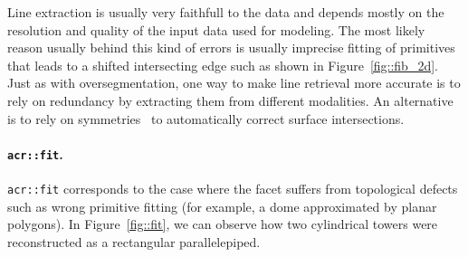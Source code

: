                 \begin{figure}[htb]
                    \centering
                \end{figure}

                Line extraction is usually very faithfull to the data and depends mostly on the resolution and quality of the input data used for modeling.
                The most likely reason usually behind this kind of errors is usually imprecise fitting of primitives that leads to a shifted intersecting edge such as shown in Figure~\ref{fig::fib_2d}.\\

                Just as with oversegmentation, one way to make line retrieval more accurate is to rely on redundancy by extracting them from different modalities.
                An alternative is to rely on symmetries~\parencite{verma20063d} to automatically correct surface intersections.

            \paragraph{\texttt{\acrlong*{acr::fit}}.}
                \texttt{\gls{acr::fit}} corresponds to the case where the facet suffers from topological defects such as wrong primitive fitting (for example, a dome approximated by planar polygons).
                In Figure~\ref{fig::fit}, we can observe how two cylindrical towers were reconstructed as a rectangular parallelepiped.\\


